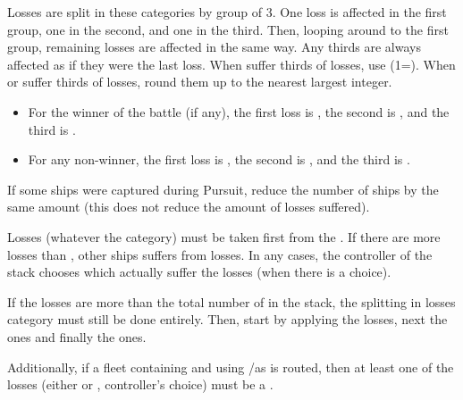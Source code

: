 Losses are split in these categories by group of 3. One loss is affected in
the first group, one in the second, and one in the third. Then, looping around
to the first group, remaining losses are affected in the same way. Any thirds
are always affected as if they were the last loss. When \NWD suffer thirds of
losses, use \NDE (1\NDE=\texttu\NWD). When \NGD or \NTD suffer thirds of
losses, round them up to the nearest largest integer.

\begin{itemize}
\item For the winner of the battle (if any), the first loss is
  , the second is , and the third is
  .
\item For any non-winner, the first loss is , the second is
  , and the third is .
\end{itemize}

If some ships were captured during Pursuit, reduce the number of
 ships by the same amount (this does not reduce the amount of
losses suffered).

Losses (whatever the category) must be taken first from the . If there are more losses than , other ships
suffers from losses. In any cases, the controller of the stack chooses which
\ND actually suffer the losses (when there is a choice).

If the losses are more than the total number of \ND in the stack, the
splitting in losses category must still be done entirely. Then, start by
applying the  losses, next the  ones and
finally the  ones.

Additionally, if a fleet containing \VGD and using \NGD/\VGD as  is routed, then at least one of the losses (either
 or , controller's choice) must be a \VGD.

